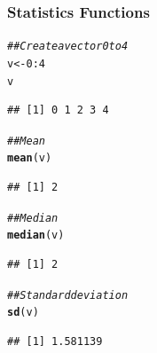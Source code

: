 \documentclass{beamer}\usepackage[]{graphicx}\usepackage[]{color}
\makeatletter
\newcommand{\hlnum}[1]{\textcolor[rgb]{0.686,0.059,0.569}{#1}}%
\newcommand{\hlcom}[1]{\textcolor[rgb]{0.678,0.584,0.686}{\textit{#1}}}%
\newcommand{\hlopt}[1]{\textcolor[rgb]{0,0,0}{#1}}%
\newcommand{\hlstd}[1]{\textcolor[rgb]{0.345,0.345,0.345}{#1}}%
\newcommand{\hlkwb}[1]{\textcolor[rgb]{0.69,0.353,0.396}{#1}}%
\newcommand{\hlkwd}[1]{\textcolor[rgb]{0.737,0.353,0.396}{\textbf{#1}}}%
\newenvironment{kframe}{%
 \def\at@end@of@kframe{}%
 \ifinner\ifhmode%
  \def\at@end@of@kframe{\end{minipage}}%
  \begin{minipage}{\columnwidth}%
 \fi\fi%
 \def\FrameCommand##1{\hskip\@totalleftmargin \hskip-\fboxsep
 \colorbox{shadecolor}{##1}\hskip-\fboxsep
     \hskip-\linewidth \hskip-\@totalleftmargin \hskip\columnwidth}%
 \MakeFramed {\advance\hsize-\width
   \@totalleftmargin\z@ \linewidth\hsize
   \@setminipage}}%
 {\par\unskip\endMakeFramed%
 \at@end@of@kframe}
\newenvironment{knitrout}{}{} %
\makeatother
\begin{document}
\begin{frame}[fragile]\frametitle{Statistics Functions}
\begin{knitrout}\footnotesize
{}\color{fgcolor}\begin{kframe}
\begin{alltt}
\hlcom{## Create a vector 0 to 4}
\hlstd{v} \hlkwb{<-} \hlnum{0}\hlopt{:}\hlnum{4}
\hlstd{v}
\end{alltt}
\begin{verbatim}
## [1] 0 1 2 3 4
\end{verbatim}
\begin{alltt}
\hlcom{## Mean}
\hlkwd{mean}\hlstd{(v)}
\end{alltt}
\begin{verbatim}
## [1] 2
\end{verbatim}
\begin{alltt}
\hlcom{## Median}
\hlkwd{median}\hlstd{(v)}
\end{alltt}
\begin{verbatim}
## [1] 2
\end{verbatim}
\begin{alltt}
\hlcom{## Standard deviation}
\hlkwd{sd}\hlstd{(v)}
\end{alltt}
\begin{verbatim}
## [1] 1.581139
\end{verbatim}
\end{kframe}
\end{knitrout}
\end{frame}
\end{document}
